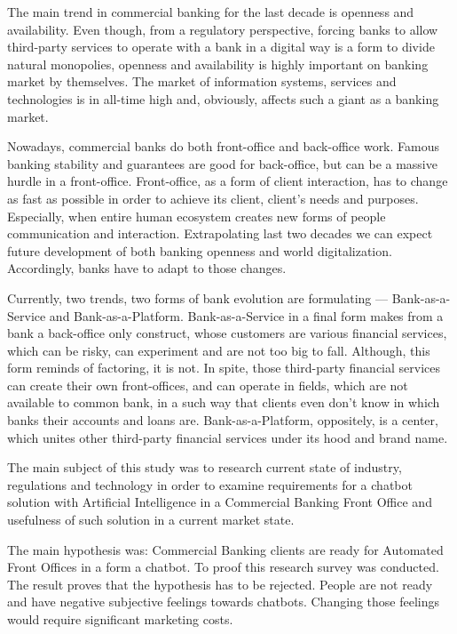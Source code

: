 

The main trend in commercial banking for the last decade is openness and availability.
Even though, from a regulatory perspective, forcing banks to allow third-party services to operate with a bank in a digital way is a form to divide natural monopolies, openness and availability is highly important on banking market by themselves.
The market of information systems, services and technologies is in all-time high and, obviously, affects such a giant as a banking market.

Nowadays, commercial banks do both front-office and back-office work.
Famous banking stability and guarantees are good for back-office, but can be a massive hurdle in a front-office.
Front-office, as a form of client interaction, has to change as fast as possible in order to achieve its client, client's needs and purposes.
Especially, when entire human ecosystem creates new forms of people communication and interaction.
Extrapolating last two decades we can expect future development of both banking openness and world digitalization.
Accordingly, banks have to adapt to those changes.

Currently, two trends, two forms of bank evolution are formulating — Bank-as-a-Service and Bank-as-a-Platform.
Bank-as-a-Service in a final form makes from a bank a back-office only construct, whose customers are various financial services, which can be risky, can experiment and are not too big to fall.
Although, this form reminds of factoring, it is not.
In spite, those third-party financial services can create their own front-offices, and can operate in fields, which are not available to common bank, in a such way that clients even don't know in which banks their accounts and loans are.
Bank-as-a-Platform, oppositely, is a center, which unites other third-party financial services under its hood and brand name.

The main subject of this study was to research current state of industry, regulations and technology in order to examine requirements for a chatbot solution with Artificial Intelligence in a Commercial Banking Front Office and usefulness of such solution in a current market state.

The main hypothesis was: Commercial Banking clients are ready for Automated Front Offices in a form a chatbot. 
To proof this research survey was conducted. 
The result proves that the hypothesis has to be rejected.
People are not ready and have negative subjective feelings towards chatbots.
Changing those feelings would require significant marketing costs.

